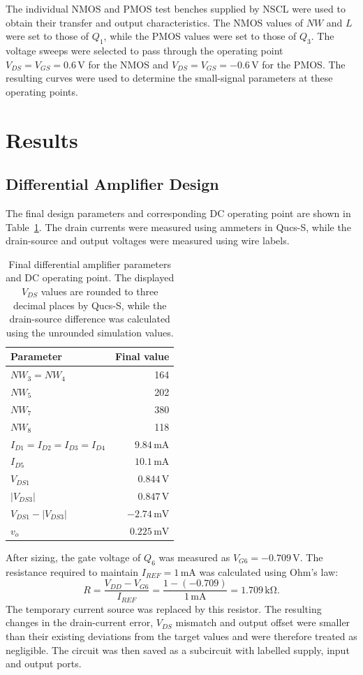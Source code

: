 \documentclass[11pt,a4paper]{article}
\begin{document}
The individual NMOS and PMOS test benches supplied by NSCL were used to obtain their transfer and output characteristics. The NMOS values of $NW$ and $L$ were set to those of $Q_1$, while the PMOS values were set to those of $Q_3$. The voltage sweeps were selected to pass through the operating point $V_{DS}=V_{GS}=0.6\,\mathrm{V}$ for the NMOS and $V_{DS}=V_{GS}=-0.6\,\mathrm{V}$ for the PMOS. The resulting curves were used to determine the small-signal parameters at these operating points.
\section{Results}

\subsection{Differential Amplifier Design}

The final design parameters and corresponding DC operating point are shown in Table~\ref{tab:final-design}. The drain currents were measured using ammeters in Qucs-S, while the drain-source and output voltages were measured using wire labels.

\begin{table}[H]\centering
\begin{tabular}{lr}\toprule
Parameter & Final value \\\midrule
$NW_3=NW_4$ & 164 \\
$NW_5$ & 202 \\
$NW_7$ & 380 \\
$NW_8$ & 118 \\
$I_{D1}=I_{D2}=I_{D3}=I_{D4}$ & $9.84\,\mathrm{mA}$ \\
$I_{D5}$ & $10.1\,\mathrm{mA}$ \\
$V_{DS1}$ & $0.844\,\mathrm{V}$ \\
$|V_{DS3}|$ & $0.847\,\mathrm{V}$ \\
$V_{DS1}-|V_{DS3}|$ & $-2.74\,\mathrm{mV}$ \\
$v_o$ & $0.225\,\mathrm{mV}$ \\\bottomrule
\end{tabular}
\caption{Final differential amplifier parameters and DC operating point. The displayed $V_{DS}$ values are rounded to three decimal places by Qucs-S, while the drain-source difference was calculated using the unrounded simulation values.}
\label{tab:final-design}\end{table}

After sizing, the gate voltage of $Q_6$ was measured as $V_{G6}=-0.709\,\mathrm{V}$. The resistance required to maintain $I_{REF}=1\,\mathrm{mA}$ was calculated using Ohm's law:
\begin{equation}
    R=\frac{V_{DD}-V_{G6}}{I_{REF}}
    =\frac{1-(-0.709)}{1\,\mathrm{mA}}
    =1.709\,\mathrm{k\Omega}.
    \label{eq:reference-resistor}
\end{equation}
The temporary current source was replaced by this resistor. The resulting changes in the drain-current error, $V_{DS}$ mismatch and output offset were smaller than their existing deviations from the target values and were therefore treated as negligible. The circuit was then saved as a subcircuit with labelled supply, input and output ports.
\end{document}
